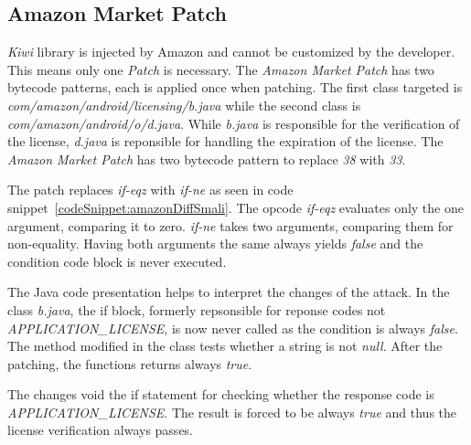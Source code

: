 \subsection{Amazon Market Patch}
\textit{Kiwi} library is injected by Amazon and cannot be customized by the developer.
This means only one \textit{Patch} is necessary.
The \textit{Amazon Market Patch} has two bytecode patterns, each is applied once when patching.
The first class targeted is \textit{com/amazon/android/licensing/b.java} while the second class is \textit{com/amazon/android/o/d.java}.
While \textit{b.java} is responsible for the verification of the license, \textit{d.java} is reponsible for handling the expiration of the license.
\newline
The \textit{Amazon Market Patch} has two bytecode pattern to replace \textit{38} with \textit{33}.

The patch replaces \textit{if-eqz} with \textit{if-ne} as seen in code snippet~\ref{codeSnippet:amazonDiffSmali}.
The opcode \textit{if-eqz} evaluates only the one argument, comparing it to zero.
\textit{if-ne} takes two arguments, comparing them for non-equality.
Having both arguments the same always yields \textit{false} and the condition code block is never executed.
\newpage

The Java code presentation helps to interpret the changes of the attack.
In the class \textit{b.java}, the if block, formerly repsonsible for reponse codes not \textit{APPLICATION\_LICENSE}, is now never called as the condition is always \textit{false}.
\newline
The method modified in the  class tests whether a string is not \textit{null}.
After the patching, the functions returns always \textit{true}.

The changes void the if statement for checking whether the response code is \textit{APPLICATION\_LICENSE}.
The result is forced to be always \textit{true} and thus the license verification always passes.

